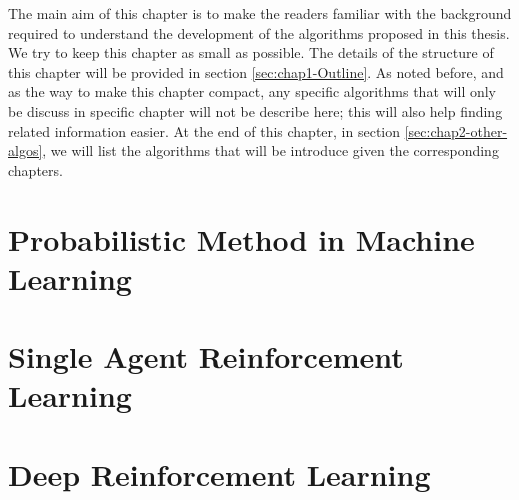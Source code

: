 \label{chapter:chap2}
\begin{adjustwidth}{1cm}{}
    The main aim of this chapter is to make the readers familiar with the background required to understand the development of the algorithms proposed in this thesis. We try to keep this chapter as small as possible. The details of the structure of this chapter will be provided in section \ref{sec:chap1-Outline}. As noted before, and as the way to make this chapter compact, any specific algorithms that will only be discuss in specific chapter will not be describe here; this will also help finding related information easier. At the end of this chapter, in section \ref{sec:chap2-other-algos}, we will list the algorithms that will be introduce given the corresponding chapters.
\end{adjustwidth}


\section{Probabilistic Method in Machine Learning}


\section{Single Agent Reinforcement Learning}


\section{Deep Reinforcement Learning}


